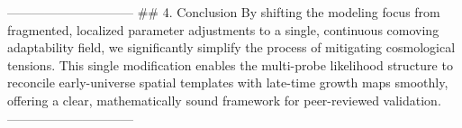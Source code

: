 ------------------------------
## 4. Conclusion
By shifting the modeling focus from fragmented, localized parameter adjustments to a single, continuous comoving adaptability field, we significantly simplify the process of mitigating cosmological tensions. This single modification enables the multi-probe likelihood structure to reconcile early-universe spatial templates with late-time growth maps smoothly, offering a clear, mathematically sound framework for peer-reviewed validation.
------------------------------
